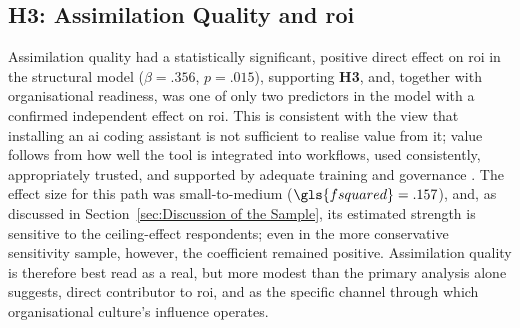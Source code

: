 \subsection{H3: Assimilation Quality and \gls{roi}}
\label{sec:Discussion H3}
Assimilation quality had a statistically significant, positive direct effect on \gls{roi} in the structural model ($\beta = .356$, $p = .015$), supporting \textbf{H3}, and, together with organisational readiness, was one of only two predictors in the model with a confirmed independent effect on \gls{roi}. This is consistent with the view that installing an \gls{ai} coding assistant is not sufficient to realise value from it; value follows from how well the tool is integrated into workflows, used consistently, appropriately trusted, and supported by adequate training and governance \autocite{Brynjolfsson2025}. The effect size for this path was small-to-medium ($\gls{fsquared} = .157$), and, as discussed in Section~\ref{sec:Discussion of the Sample}, its estimated strength is sensitive to the ceiling-effect respondents; even in the more conservative sensitivity sample, however, the coefficient remained positive. Assimilation quality is therefore best read as a real, but more modest than the primary analysis alone suggests, direct contributor to \gls{roi}, and as the specific channel through which organisational culture's influence operates.

